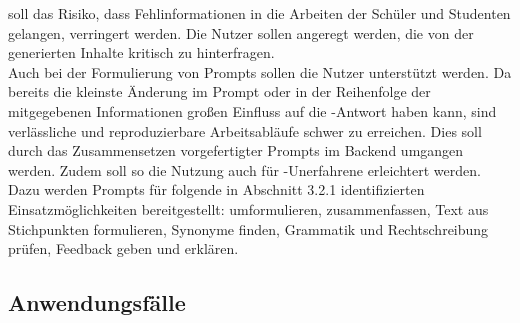 \documentclass[../main.tex]{subfiles}
\begin{document}
soll das Risiko, dass Fehlinformationen in die Arbeiten der Schüler und Studenten gelangen, verringert werden. Die Nutzer sollen angeregt werden, die von der  generierten Inhalte 
kritisch zu hinterfragen.\\
Auch bei der Formulierung von Prompts sollen die Nutzer unterstützt werden. Da bereits die kleinste Änderung im Prompt oder in der Reihenfolge der mitgegebenen Informationen großen 
Einfluss auf die -Antwort haben kann, sind verlässliche und reproduzierbare Arbeitsabläufe schwer zu erreichen\cite{creativeWriting}. Dies soll durch das Zusammensetzen vorgefertigter 
Prompts im Backend umgangen werden. Zudem soll so die Nutzung auch für -Unerfahrene erleichtert werden. Dazu werden Prompts für folgende in Abschnitt 3.2.1 identifizierten 
Einsatzmöglichkeiten bereitgestellt: umformulieren, zusammenfassen, Text aus Stichpunkten formulieren, Synonyme finden, Grammatik und Rechtschreibung prüfen, Feedback geben und 
erklären.


\subsection{Anwendungsfälle}
\end{document}
